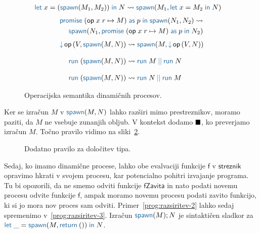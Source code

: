 \begin{figure}[H]
	\centering
	\small
	\begin{align*}
	\tmlet{x}{(\tmspawn{M_1}{M_2})}{N} & \reduces \tmspawn{M_1}{\tmlet{x}{M_2}{N}}
	\end{align*}
	\vspace{-5ex}
	\begin{align*}
	\tmwithrec{op}{x}{r}{M}{p}{\tmspawn{N_1}{N_2}} \reduces \\
	\tmspawn{N_1}{\tmwithrec{op}{x}{r}{M}{p}{N_2}}
	\end{align*}
	\vspace{-5ex}
	\begin{align*}
	\tmopin{op}{V}{\tmspawn{M}{N}} & \reduces \tmspawn{M}{\tmopin{op}{V}{N}}
	\razmik
	\tmrun{(\tmspawn{M}{N})} & \reduces \tmpar{\tmrun{M}}{\tmrun{N}}
	\razmik
	\tmrun{(\tmspawn{M}{N})} & \reduces \tmpar{\tmrun{N}}{\tmrun{M}}
	\end{align*}
	
	\caption{Operacijska semantika dinamičnih procesov.}
	\label{fig:semantika-spawn}
\end{figure}

Ker se izračun $M$ v $\tmspawn{M}{N}$ lahko razširi mimo prestreznikov, moramo paziti, da $M$ ne vsebuje zunanjih obljub. V kontekst dodamo $\bb$, ko preverjamo izračun $M$. Točno pravilo vidimo na sliki~\ref{fig:tipi-pravila-spawn}.

\begin{figure}[H]
	\centering
	\small
	\begin{mathpar}
	\end{mathpar}
	\vspace{-5ex}
	\caption{Dodatno pravilo za določitev tipa.}
	\label{fig:tipi-pravila-spawn}
\end{figure}


Sedaj, ko imamo dinamične procese, lahko obe evalvaciji funkcije $\mathsf{f}$ v $\mathsf{streznik}$ opravimo hkrati v svojem procesu, kar potencialno pohitri izvajanje programa. 
Tu bi opozorili, da ne smemo odviti funkcije $\mathsf{fZavita}$ in nato podati novemu procesu odvite funkcije $\mathsf{f}$, ampak moramo novemu procesu podati zavito funkcijo, ki si jo mora nov proces sam odviti. 
Primer~\ref{prog:razsiritev-2} lahko sedaj spremenimo v~\ref{prog:razsiritev-3}.
Izračun $\tmkw{spawn}(M);N$ je sintaktičen sladkor za $\tmlet{\_}{\tmspawn{M}{\tmreturn{()}}}{N}$. 

